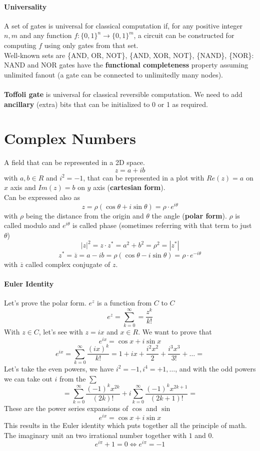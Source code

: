 \documentclass[10pt]{report}
\begin{document}
\paragraph{Universality} A set of gates is universal for classical computation if, for any positive integer $n,m$ and any function $f : \{0,1\}^n\rightarrow \{0,1\}^m$, a circuit can be constructed for computing $f$ using only gates from that set.\\
Well-known sets are \{AND, OR, NOT\}, \{AND, XOR, NOT\}, \{NAND\}, \{NOR\}:  NAND and NOR gates have the \textbf{functional completeness} property assuming unlimited fanout (a gate can be connected to unlimitedly many nodes).\\\\
\textbf{Toffoli gate} is universal for classical reversible computation. We need to add \textbf{ancillary} (extra) bits that can be initialized to 0 or 1 as required.
\section{Complex Numbers}
A field that can be represented in a 2D space.
$$z = a + ib$$ with $a,b \in R$ and $i^2 = -1$, that can be represented in a plot with $Re(z) = a$ on $x$ axis and $Im(z) = b$ on $y$ axis (\textbf{cartesian form}).\\
Can be expressed also as $$z = \rho(\cos\theta + i \sin\theta) = \rho \cdot e^{i\theta}$$ with $\rho$ being the distance from the origin and $\theta$ the angle (\textbf{polar form}). $\rho$ is called modulo and $e^{i\theta}$ is called phase (sometimes referring with that term to just $\theta$)
$$|z|^2 = z\cdot z^* = a^2 + b^2 = \rho^2 = |z^*|$$
$$z^* = \overline{z} = a-ib = \rho(\cos\theta - i\sin\theta) = \rho\cdot e^{-i\theta}$$
with $\overline{z}$ called complex conjugate of $z$.
\paragraph{Euler Identity} Let's prove the polar form. $e^z$ is a function from $C$ to $C$
$$e^z = \sum_{k=0}^\infty = \frac{z^k}{k!}$$
With $z\in C$, let's see with $z = ix$ and $x\in R$. We want to prove that
$$e^{ix} = \cos x + i\sin x$$
\pagebreak
$$e^{ix} = \sum_{k=0}^\infty \frac{(ix)^k}{k!} = 1 + ix + \frac{i^2x^2}{2} + \frac{i^3x^3}{3!} + \ldots=$$
Let's take the even powers, we have $i^2 = -1, i^4 = +1,\ldots$, and with the odd powers we can take out $i$ from the $\sum$
$$= \sum_{k=0}^\infty \frac{(-1)^{k}x^{2k}}{(2k)!} + i\sum_{k=0}^\infty \frac{(-1)^k x^{2k+1}}{(2k+1)!} =$$
These are the power series expansions of $\cos$ and $\sin$
$$e^{ix}=\cos x + i \sin x$$
This results in the Euler identity which puts together all the principle of math. The imaginary unit an two irrational number together with $1$ and $0$.
$$e^{i\pi} + 1 = 0 \Leftrightarrow e^{i\pi} = -1$$
\end{document}
